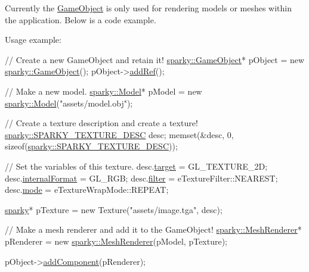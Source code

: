 Currently the \hyperlink{classsparky_1_1_game_object}{Game\+Object} is only used for rendering models or meshes within the application. Below is a code example.

Usage example\+: 
\begin{DoxyCode}
\textcolor{comment}{// Create a new GameObject and retain it!}
\hyperlink{classsparky_1_1_game_object}{sparky::GameObject}* pObject = \textcolor{keyword}{new} \hyperlink{classsparky_1_1_game_object}{sparky::GameObject}();
pObject->\hyperlink{classsparky_1_1_ref_aeeb606836c315aa3b8a2254e23eb0899}{addRef}();

\textcolor{comment}{// Make a new model.}
\hyperlink{classsparky_1_1_model}{sparky::Model}* pModel = \textcolor{keyword}{new} \hyperlink{classsparky_1_1_model}{sparky::Model}(\textcolor{stringliteral}{"assets/model.obj"});

\textcolor{comment}{// Create a texture description and create a texture!}
\hyperlink{structsparky_1_1_s_p_a_r_k_y___t_e_x_t_u_r_e___d_e_s_c}{sparky::SPARKY\_TEXTURE\_DESC} desc;
memset(&desc, 0, \textcolor{keyword}{sizeof}(\hyperlink{structsparky_1_1_s_p_a_r_k_y___t_e_x_t_u_r_e___d_e_s_c}{sparky::SPARKY\_TEXTURE\_DESC}));

\textcolor{comment}{// Set the variables of this texture.}
desc.\hyperlink{structsparky_1_1_s_p_a_r_k_y___t_e_x_t_u_r_e___d_e_s_c_aa16d4a1609584eecae520984f0c844fa}{target}         = GL\_TEXTURE\_2D;
desc.\hyperlink{structsparky_1_1_s_p_a_r_k_y___t_e_x_t_u_r_e___d_e_s_c_a41118481a1e1ebbae3ff6909d583112a}{internalFormat} = GL\_RGB;
desc.\hyperlink{structsparky_1_1_s_p_a_r_k_y___t_e_x_t_u_r_e___d_e_s_c_a578a5137068a9f9bb9a672931928ae04}{filter}         = eTextureFilter::NEAREST;
desc.\hyperlink{structsparky_1_1_s_p_a_r_k_y___t_e_x_t_u_r_e___d_e_s_c_a9b527f02b0469a529c146bcf14574dcb}{mode}           = eTextureWrapMode::REPEAT;

\hyperlink{namespacesparky}{sparky}* pTexture = \textcolor{keyword}{new} Texture(\textcolor{stringliteral}{"assets/image.tga"}, desc);

\textcolor{comment}{// Make a mesh renderer and add it to the GameObject!}
\hyperlink{classsparky_1_1_mesh_renderer}{sparky::MeshRenderer}* pRenderer = \textcolor{keyword}{new} \hyperlink{classsparky_1_1_mesh_renderer}{sparky::MeshRenderer}(pModel, 
      pTexture);

pObject->\hyperlink{classsparky_1_1_game_object_ac84af9cef43bab887437b7257c6237db}{addComponent}(pRenderer);
\end{DoxyCode}
 


